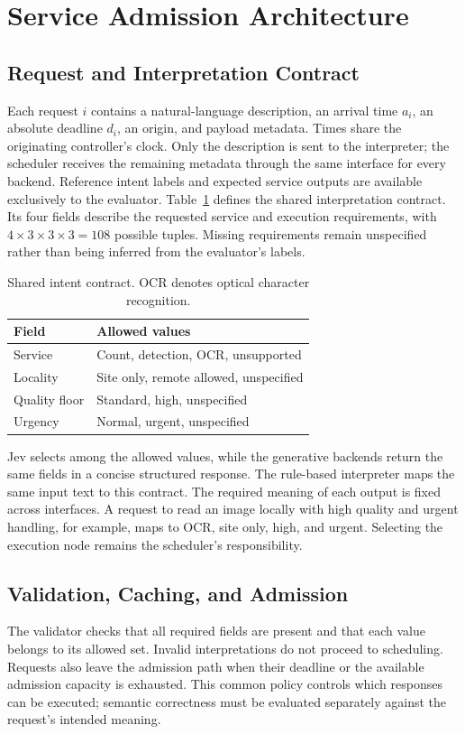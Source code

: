 \section{Service Admission Architecture}
\label{sec:system}
\subsection{Request and Interpretation Contract}
Each request $i$ contains a natural-language description, an arrival time
$a_i$, an absolute deadline $d_i$, an origin, and payload metadata. Times
share the originating controller's clock. Only the
description is sent to the interpreter; the scheduler receives the remaining
metadata through the same interface for every backend. Reference intent
labels and expected service outputs are available exclusively to the
evaluator. Table~\ref{tab:schema} defines the shared interpretation contract.
Its four fields describe the requested service and execution requirements,
with $4\times3\times3\times3=108$ possible tuples. Missing requirements remain
unspecified rather than being inferred from the evaluator's labels.

\begin{table}[t]
\caption{Shared intent contract. OCR denotes optical character recognition.}
\label{tab:schema}
\centering
\begin{tabular}{@{}ll@{}}
\toprule
Field & Allowed values \\
\midrule
Service & Count, detection, OCR, unsupported \\
Locality & Site only, remote allowed, unspecified \\
Quality floor & Standard, high, unspecified \\
Urgency & Normal, urgent, unspecified \\
\bottomrule
\end{tabular}
\end{table}

Jev selects among the allowed values, while the generative backends return
the same fields in a concise structured response. The rule-based interpreter
maps the same input text to this contract. The required meaning of each
output is fixed across interfaces. A request to read an image
locally with high quality and urgent handling, for example, maps to OCR, site
only, high, and urgent. Selecting the execution node remains the scheduler's
responsibility.

\subsection{Validation, Caching, and Admission}
The validator checks that all required fields are present and that each value
belongs to its allowed set. Invalid interpretations do not proceed to
scheduling. Requests also leave the admission path when their deadline or
the available admission capacity is exhausted. This common policy controls
which responses can be executed; semantic correctness must be evaluated
separately against the request's intended meaning.

